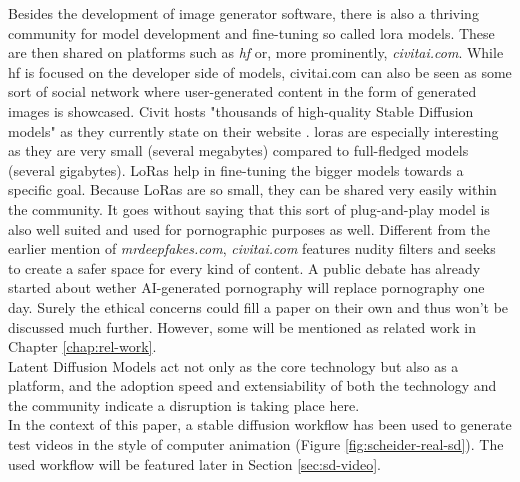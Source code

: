\documentclass[
  a4paper,  %
  twoside,  %
  bibliography=totoc,
  headsepline,
  cleardoublepage=empty,
  parskip=half,
  draft=false
]{scrbook}
\begin{document}
Besides the development of image generator software, there is also a thriving community for model development and fine-tuning so called \gls{lora} models. These are then shared on platforms such as \textit{\gls{hf}} or, more prominently, \textit{civitai.com}. While \gls{hf} is focused on the developer side of models, civitai.com can also be seen as some sort of social network where user-generated content in the form of generated images is showcased. Civit hosts "thousands of high-quality Stable Diffusion models" as they currently state on their website \cite{CivitaiHomeOpenSource}. \gls{lora}s are especially interesting as they are very small (several megabytes) compared to full-fledged models (several gigabytes). LoRas help in fine-tuning the bigger models towards a specific goal. Because LoRas are so small, they can be shared very easily within the community. It goes without saying that this sort of plug-and-play model is also well suited and used for pornographic purposes as well. Different from the earlier mention of \textit{mrdeepfakes.com}, \textit{civitai.com} features nudity filters and seeks to create a safer space for every kind of content. A public debate has already started about wether AI-generated pornography will replace pornography one day. Surely the ethical concerns could fill a paper on their own and thus won't be discussed much further. However, some will be mentioned as related work in Chapter \ref{chap:rel-work}.\\
Latent Diffusion Models act not only as the core technology but also as a platform, and the adoption speed and extensiability of both the technology and the community indicate a disruption is taking place here. \\
In the context of this paper, a stable diffusion workflow has been used to generate test videos in the style of computer animation (Figure \ref{fig:scheider-real-sd}). The used workflow will be featured later in Section \ref{sec:sd-video}. 
\end{document}
